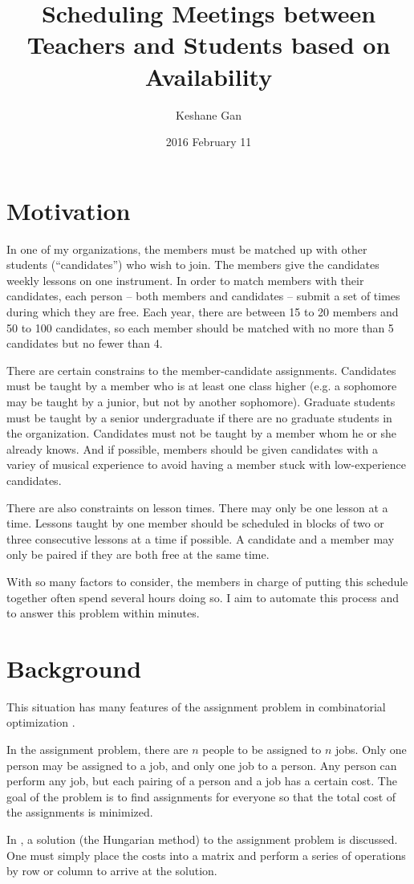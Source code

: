 \documentclass[letterpaper, 12pt]{article}
\title{Scheduling Meetings between Teachers and Students based on Availability}
\author{Keshane Gan}
\date{2016 February 11}
\begin{document}
\maketitle

\section*{Motivation}
In one of my organizations, the members must be matched up with other students (“candidates”) who wish to join. The
members give the candidates weekly lessons on one instrument. In order to match members with their candidates, each
person – both members and candidates – submit a set of times during which they are free. Each year, there are between 15
to 20 members and 50 to 100 candidates, so each member should be matched with no more than 5 candidates but no fewer
than 4. \par 
There are certain constrains to the member-candidate assignments. Candidates must be taught by a member who is at least
one class higher (e.g. a sophomore may be taught by a junior, but not by another sophomore). Graduate students must be
taught by a senior undergraduate if there are no graduate students in the organization. 
Candidates must not be taught by a member whom he or she already knows. And if possible, members should be given
candidates with a variey of musical experience to avoid having a member stuck with low-experience candidates. \par
There are also constraints on lesson times. There may only be one lesson at a
time. Lessons taught by one member should be scheduled in blocks of two or
three consecutive lessons at a time if possible. A candidate and a member may only be paired if they are both free at
the same time. \par
With so many factors to consider, the members in charge of putting this schedule together often spend
several hours doing so. I aim to automate this process and to answer this problem within minutes.

\section*{Background}

This situation has many features of the assignment problem in combinatorial optimization \cite{Munkres}. \par
In the assignment problem, there are $n$ people to be assigned to $n$ jobs. Only one person may be assigned to a job, and
only one job to a person. Any person can perform any job, but each pairing of a person and a job has a certain cost. 
The goal of the problem is to find assignments for everyone so that the total cost of the assignments is minimized.\par
In \cite{Munkres}, a solution (the Hungarian method) to the assignment problem is discussed. One must simply place the
costs into a matrix and perform a series of operations by row or column to arrive at the solution. \par
\end{document}

